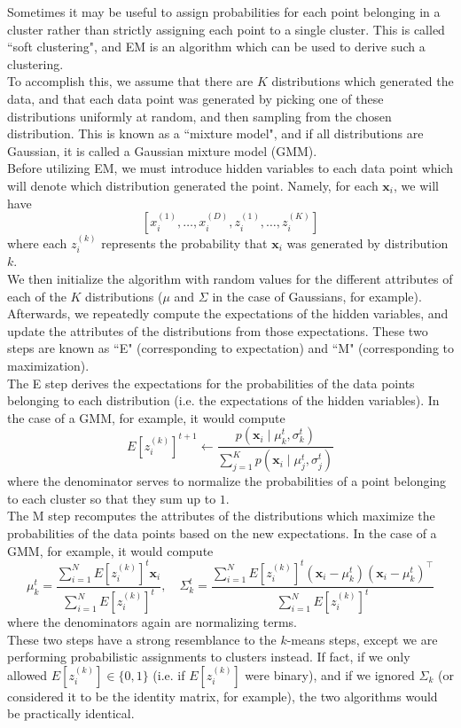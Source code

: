 \documentclass[12pt]{article}
\begin{document}
Sometimes it may be useful to assign probabilities for each point belonging in a cluster rather than strictly assigning each point to a single cluster. This is called ``soft clustering", and EM is an algorithm which can be used to derive such a clustering.
\\\newline
To accomplish this, we assume that there are $K$ distributions which generated the data, and that each data point was generated by picking one of these distributions uniformly at random, and then sampling from the chosen distribution. This is known as a ``mixture model", and if all distributions are Gaussian, it is called a Gaussian mixture model (GMM). 
\\\newline
Before utilizing EM, we must introduce hidden variables to each data point which will denote which distribution generated the point. Namely, for each $\mathbf{x}_i$, we will have
\[ [x_i^{(1)}, \dots, x_i^{(D)}, z_i^{(1)}, \dots, z_i^{(K)}] \]
where each $z_i^{(k)}$ represents the probability that $\mathbf{x}_i$ was generated by distribution $k$.
\\\newline
We then initialize the algorithm with random values for the different attributes of each of the $K$ distributions ($\mu$ and $\Sigma$ in the case of Gaussians, for example).
\\\newline
Afterwards, we repeatedly compute the expectations of the hidden variables, and update the attributes of the distributions from those expectations. These two steps are known as ``E" (corresponding to expectation) and ``M" (corresponding to maximization).
\\\newline
The E step derives the expectations for the probabilities of the data points belonging to each distribution (i.e. the expectations of the hidden variables). In the case of a GMM, for example, it would compute
\[ E[z_i^{(k)}]^{t+1} \leftarrow \frac{p(\mathbf{x}_i \mid \mu_k^t, \sigma_k^t)}{\sum_{j=1}^Kp(\mathbf{x}_i \mid \mu_j^t, \sigma_j^t)} \]
where the denominator serves to normalize the probabilities of a point belonging to each cluster so that they sum up to $1$.
\\\newline
The M step recomputes the attributes of the distributions which maximize the probabilities of the data points based on the new expectations. In the case of a GMM, for example, it would compute
\[ \mu_k^t = \frac{\sum_{i=1}^{N}E[z_i^{(k)}]^t\mathbf{x}_i}{\sum_{i=1}^{N}E[z_i^{(k)}]^t}, \quad \Sigma_k^t = \frac{\sum_{i=1}^{N}E[z_i^{(k)}]^t(\mathbf{x}_i - \mu_k^t)(\mathbf{x}_i - \mu_k^t)^\top}{\sum_{i=1}^{N}E[z_i^{(k)}]^t} \]
where the denominators again are normalizing terms.
\\\newline
These two steps have a strong resemblance to the $k$-means steps, except we are performing probabilistic assignments to clusters instead. If fact, if we only allowed $E[z_i^{(k)}] \in \{0, 1\}$ (i.e. if $E[z_i^{(k)}]$ were binary), and if we ignored $\Sigma_k$ (or considered it to be the identity matrix, for example), the two algorithms would be practically identical.
\end{document}
